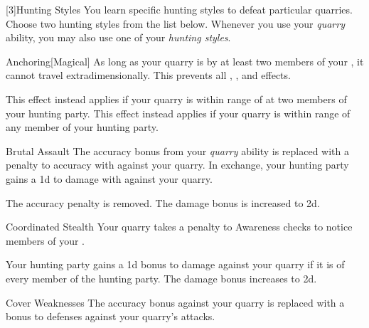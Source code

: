         [3]{Hunting Styles}
        You learn specific hunting styles to defeat particular quarries.
        Choose two hunting styles from the list below.
        Whenever you use your \textit{quarry} ability, you may also use one of your \textit{hunting styles}.
        {
            \begin{ability}{Anchoring}[Magical]
                As long as your quarry is  by at least two members of your , it cannot travel extradimensionally.
                This prevents all , , and  effects.

                \rankline
                 This effect instead applies if your quarry is within \rngmed range of at two members of your hunting party.
                 This effect instead applies if your quarry is within \rnglong range of any member of your hunting party.
            \end{ability}

            \begin{ability}{Brutal Assault}
                The accuracy bonus from your \textit{quarry} ability is replaced with a  penalty to accuracy with  against your quarry.
                In exchange, your hunting party gains a \plus1d  to damage with  against your quarry.

                \rankline
                 The accuracy penalty is removed.
                 The damage bonus is increased to \plus2d.
            \end{ability}

            \begin{ability}{Coordinated Stealth}
                Your quarry takes a  penalty to Awareness checks to notice members of your .

                \rankline
                 Your hunting party gains a \plus1d bonus to damage against your quarry if it is \unaware of every member of the hunting party.
                 The damage bonus increases to \plus2d.
            \end{ability}

            \begin{ability}{Cover Weaknesses}
                The accuracy bonus against your quarry is replaced with a  bonus to defenses against your quarry's attacks.


\end{ability}}
